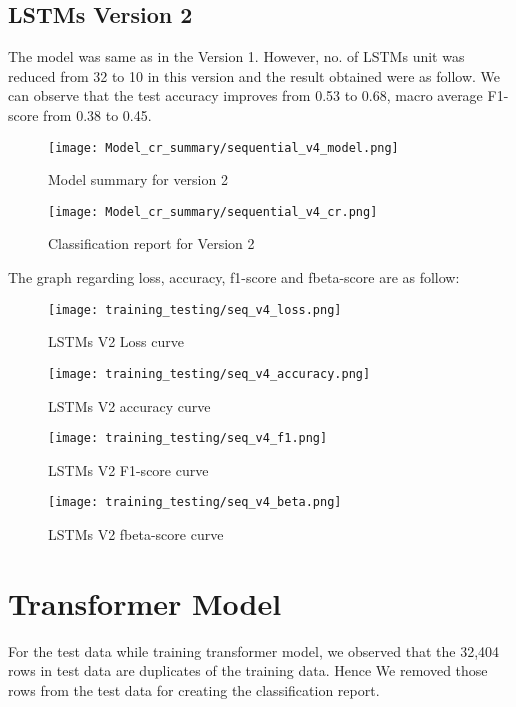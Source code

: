 \subsection{LSTMs Version 2}
The model was same as in the Version 1. However, no. of LSTMs unit was reduced from 32 to 10 in this version and the result obtained were as follow. We can observe that the test accuracy improves from 0.53 to 0.68, macro average F1-score from 0.38 to 0.45.

\begin{figure}[H]
    \centering
    \texttt{[image: Model\_cr\_summary/sequential\_v4\_model.png]}
    \caption{Model summary for version 2}
    \label{fig:Model summary for version 2}
\end{figure}

\begin{figure}[H]
    \centering
    \texttt{[image: Model\_cr\_summary/sequential\_v4\_cr.png]}
    \caption{Classification report for Version 2}
    \label{fig: Classification report for Version 2}
\end{figure}

The graph regarding loss, accuracy, f1-score and fbeta-score are as follow:

\begin{figure}[H]
    \centering
    \texttt{[image: training\_testing/seq\_v4\_loss.png]}
    \caption{LSTMs V2 Loss curve}
    \label{fig:LSTMs V2 loss curve}
\end{figure}

\begin{figure}[H]
    \centering
    \texttt{[image: training\_testing/seq\_v4\_accuracy.png]}
    \caption{LSTMs V2 accuracy curve}
    \label{fig:LSTMs V2 accuracy curve}
\end{figure}

\begin{figure}[H]
    \centering
    \texttt{[image: training\_testing/seq\_v4\_f1.png]}
    \caption{LSTMs V2 F1-score curve}
    \label{fig:LSTMs V2 F1-score curve}
\end{figure}

\begin{figure}[H]
    \centering
    \texttt{[image: training\_testing/seq\_v4\_beta.png]}
    \caption{LSTMs V2 fbeta-score curve}
    \label{fig:LSTMs V2 fbeta-score curve}
\end{figure}

\section{Transformer Model}
For the test data while training transformer model, we observed that the 32,404 rows in test data are duplicates of the training data. Hence We removed those rows from the test data for creating the classification report.

